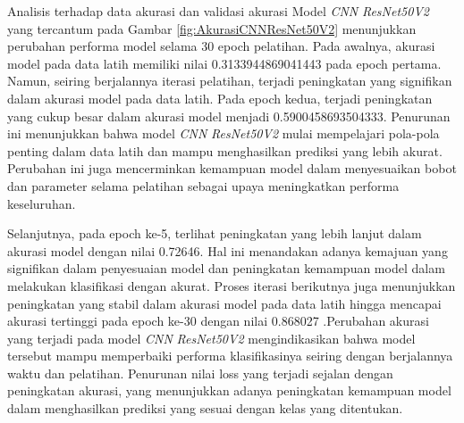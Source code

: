Analisis terhadap data akurasi dan validasi akurasi Model \textit{CNN} \textit{ResNet50V2} yang tercantum pada Gambar \ref{fig:AkurasiCNNResNet50V2} menunjukkan perubahan performa model selama 30 epoch pelatihan. Pada awalnya, akurasi model pada data latih memiliki nilai 0.3133944869041443 pada epoch pertama. Namun, seiring berjalannya iterasi pelatihan, terjadi peningkatan yang signifikan dalam akurasi model pada data latih. Pada epoch kedua, terjadi peningkatan yang cukup besar dalam akurasi model menjadi 0.5900458693504333. Penurunan ini menunjukkan bahwa model \textit{CNN} \textit{ResNet50V2} mulai mempelajari pola-pola penting dalam data latih dan mampu menghasilkan prediksi yang lebih akurat. Perubahan ini juga mencerminkan kemampuan model dalam menyesuaikan bobot dan parameter selama pelatihan sebagai upaya meningkatkan performa keseluruhan.

Selanjutnya, pada epoch ke-5, terlihat peningkatan yang lebih lanjut dalam akurasi model dengan nilai 0.72646. Hal ini menandakan adanya kemajuan yang signifikan dalam penyesuaian model dan peningkatan kemampuan model dalam melakukan klasifikasi dengan akurat. Proses iterasi berikutnya juga menunjukkan peningkatan yang stabil dalam akurasi model pada data latih hingga mencapai akurasi tertinggi pada epoch ke-30 dengan nilai 0.868027 .Perubahan akurasi yang terjadi pada model \textit{CNN} \textit{ResNet50V2} mengindikasikan bahwa model tersebut mampu memperbaiki performa klasifikasinya seiring dengan berjalannya waktu dan pelatihan. Penurunan nilai loss yang terjadi sejalan dengan peningkatan akurasi, yang menunjukkan adanya peningkatan kemampuan model dalam menghasilkan prediksi yang sesuai dengan kelas yang ditentukan.

